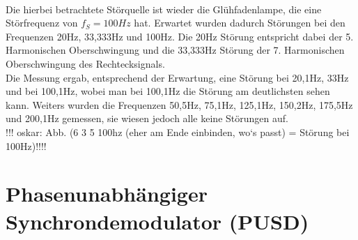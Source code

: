 ~\\
Die hierbei betrachtete Störquelle ist wieder die Glühfadenlampe, die eine Störfrequenz von $f_S = 100Hz$ hat. Erwartet wurden dadurch Störungen bei den Frequenzen 20Hz, 33,333Hz und 100Hz. Die 20Hz Störung entspricht dabei der 5. Harmonischen Oberschwingung und die 33,333Hz Störung der 7. Harmonischen Oberschwingung des Rechtecksignals.
~\\
Die Messung ergab, entsprechend der Erwartung, eine Störung bei 20,1Hz, 33Hz und bei 100,1Hz, wobei man bei 100,1Hz die Störung am deutlichsten sehen kann. Weiters wurden die Frequenzen 50,5Hz, 75,1Hz, 125,1Hz, 150,2Hz, 175,5Hz und 200,1Hz gemessen, sie wiesen jedoch alle keine Störungen auf.
~\\
!!! oskar: Abb. (6 3 5 100hz (eher am Ende einbinden, wo‘s passt) = Störung bei 100Hz)!!!!


\section{Phasenunabhängiger Synchrondemodulator (PUSD)}

